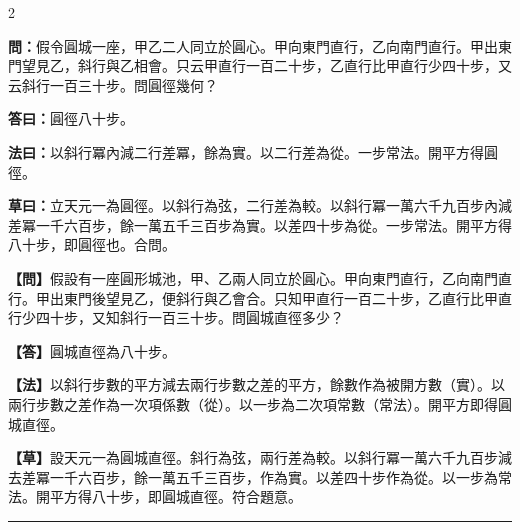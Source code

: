\documentclass[11pt,a4paper]{article}
\newcommand{\longline}{\noindent\rule{\textwidth}{0.4pt}}
\newcommand{\wenC}[1]{\par\noindent\textbf{\textcolor{probcolor}{問：}}{#1}\par}
\newcommand{\daC}[1]{\par\noindent\textbf{\textcolor{anscolor}{答曰：}}{#1}\par}
\newcommand{\fayueC}[1]{\par\noindent\textbf{\textcolor{methodcolor}{法曰：}}{#1}\par}
\newcommand{\caoyueC}[1]{\par\noindent\textbf{草曰：}{#1}\par}
\newcommand{\wenM}[1]{\par\noindent\textbf{\textcolor{probcolor}{【問】}}{#1}\par}
\newcommand{\daM}[1]{\par\noindent\textbf{\textcolor{anscolor}{【答】}}{#1}\par}
\newcommand{\fayueM}[1]{\par\noindent\textbf{\textcolor{methodcolor}{【法】}}{#1}\par}
\newcommand{\caoyueM}[1]{\par\noindent\textbf{【草】}{#1}\par}
\begin{document}
\begin{paracol}{2}

\wenC{假令圓城一座，甲乙二人同立於圓心。甲向東門直行，乙向南門直行。甲出東門望見乙，斜行與乙相會。只云甲直行一百二十步，乙直行比甲直行少四十步，又云斜行一百三十步。問圓徑幾何？}

\daC{圓徑八十步。}

\fayueC{以斜行冪內減二行差冪，餘為實。以二行差為從。一步常法。開平方得圓徑。}

\caoyueC{立天元一為圓徑。以斜行為弦，二行差為較。以斜行冪一萬六千九百步內減差冪一千六百步，餘一萬五千三百步為實。以差四十步為從。一步常法。開平方得八十步，即圓徑也。合問。}

\switchcolumn

\wenM{假設有一座圓形城池，甲、乙兩人同立於圓心。甲向東門直行，乙向南門直行。甲出東門後望見乙，便斜行與乙會合。只知甲直行一百二十步，乙直行比甲直行少四十步，又知斜行一百三十步。問圓城直徑多少？}

\daM{圓城直徑為八十步。}

\fayueM{以斜行步數的平方減去兩行步數之差的平方，餘數作為被開方數（實）。以兩行步數之差作為一次項係數（從）。以一步為二次項常數（常法）。開平方即得圓城直徑。}

\caoyueM{設天元一為圓城直徑。斜行為弦，兩行差為較。以斜行冪一萬六千九百步減去差冪一千六百步，餘一萬五千三百步，作為實。以差四十步作為從。以一步為常法。開平方得八十步，即圓城直徑。符合題意。}

\end{paracol}

\vspace{0.3cm}
\longline
\end{document}
